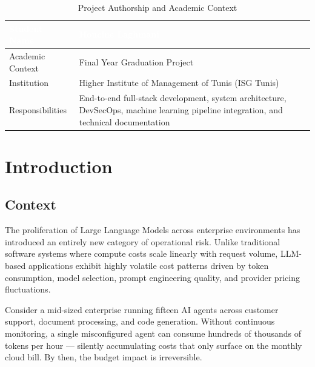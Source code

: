 \documentclass[12pt,a4paper,twoside]{report}
\begin{document}
\begin{table}[H]
\centering
\begin{tabularx}{\textwidth}{|l|X|}
\hline
\rowcolor{tabheader}
\textcolor{white}{\textbf{Student Name}} &
\textcolor{white}{\textbf{Houcine Laghmani}} \\
\hline
Academic Context & Final Year Graduation Project \\
\hline
Institution & Higher Institute of Management of Tunis (ISG Tunis) \\
\hline
Responsibilities & End-to-end full-stack development, system architecture, DevSecOps, machine learning pipeline integration, and technical documentation \\
\hline
\end{tabularx}
\caption{Project Authorship and Academic Context}
\end{table}

\tableofcontents
\listoffigures
\listoftables

\clearpage
{}

\chapter{Introduction}

\section{Context}

The proliferation of Large Language Models across enterprise environments has introduced an entirely new category of operational risk. Unlike traditional software systems where compute costs scale linearly with request volume, LLM-based applications exhibit highly volatile cost patterns driven by token consumption, model selection, prompt engineering quality, and provider pricing fluctuations.

Consider a mid-sized enterprise running fifteen AI agents across customer support, document processing, and code generation. Without continuous monitoring, a single misconfigured agent can consume hundreds of thousands of tokens per hour — silently accumulating costs that only surface on the monthly cloud bill. By then, the budget impact is irreversible.
\end{document}
